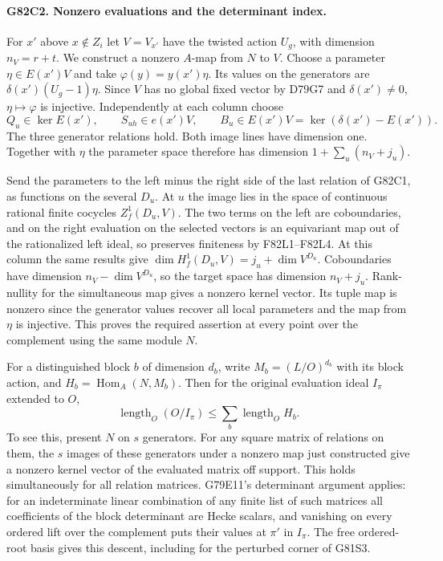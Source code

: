 \paragraph{G82C2. Nonzero evaluations and the determinant index.}
For $x'$ above $x\notin Z_i$ let $V=V_{x'}$ have the twisted
action $U_g$, with dimension $n_V=r+t$. We construct a nonzero
$A$-map from $N$ to $V$. Choose a parameter $\eta\in E(x')V$
and take $\varphi(y)=y(x')\eta$. Its values on the generators
are $\delta(x')(U_g-1)\eta$. Since $V$ has no global fixed vector
by D79G7 and $\delta(x')\ne0$, $\eta\mapsto\varphi$ is injective.
Independently at each column choose
\[
 Q_u\in\ker E(x'),\qquad S_{uh}\in e(x')V,\qquad
 B_u\in E(x')V=\ker(\delta(x')-E(x')).
\]
The three generator relations hold. Both image lines have dimension
one. Together with $\eta$ the parameter space therefore has
dimension $1+\sum_u(n_V+j_u)$.

Send the parameters to the left minus the right side of the last
relation of G82C1, as functions on the several $D_u$. At $u$ the
image lies in the space of continuous rational finite cocycles
$Z_f^1(D_u,V)$. The two terms on the left are coboundaries, and
on the right evaluation on the selected vectors is an equivariant
map out of the rationalized left ideal, so preserves finiteness by
F82L1--F82L4. At this column the same results give
$\dim H_f^1(D_u,V)=j_u+\dim V^{D_u}$.
Coboundaries have dimension $n_V-\dim V^{D_u}$, so the target
space has dimension $n_V+j_u$. Rank-nullity for the simultaneous
map gives a nonzero kernel vector. Its tuple map is nonzero since
the generator values recover all local parameters and the map from
$\eta$ is injective. This proves the required assertion at every
point over the complement using the same module $N$.

For a distinguished block $b$ of dimension $d_b$, write
$M_b=(L/O)^{d_b}$ with its block action, and $H_b=\operatorname{Hom}_A(N,M_b)$.
Then for the original evaluation ideal $I_\pi$ extended to $O$,
\[
                  \operatorname{length}_O(O/I_\pi)
                          \le \sum_b \operatorname{length}_O H_b .
\]
To see this, present $N$ on $s$ generators. For any square matrix
of relations on them, the $s$ images of these generators under a
nonzero map just constructed give a nonzero kernel vector of the
evaluated matrix off support. This holds simultaneously for all
relation matrices. G79E11's determinant argument applies: for an
indeterminate linear combination of any finite list of such matrices
all coefficients of the block determinant are Hecke scalars, and
vanishing on every ordered lift over the complement puts their
values at $\pi'$ in $I_\pi$. The free ordered-root basis gives
this descent, including for the perturbed corner of G81S3.

